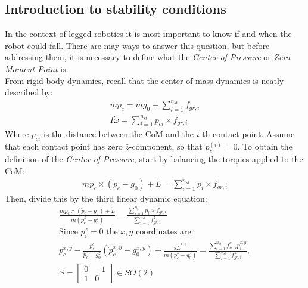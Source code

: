 \subsection{Introduction to stability conditions}
In the context of legged robotics it is most important to know if and when the robot could fall. There are may ways to answer this question, but before addressing them, it is necessary to define what the \textit{Center of Pressure} or \textit{Zero Moment Point} is.\\
From rigid-body dynamics, recall that the center of mass dynamics is neatly described by:
\begin{gather*}
    m\ddot{p}_c=mg_0+\sum_{i=1}^{n_{st}}f_{gr,i}\\
    I\dot{\omega}=\sum_{i=1}^{n_{st}}p_{ci}\times f_{gr,i}
\end{gather*}
Where $p_{ci}$ is the distance between the CoM and the $i$-th contact point. Assume that each contact point has zero $\hat{z}$-component, so that $p_z^{(i)}=0$. To obtain the definition of the \textit{Center of Pressure}, start by balancing the torques applied to the CoM:
\begin{gather*}
    mp_c\times(\ddot{p}_c-g_0)+\dot{L}=\sum_{i=1}^{n_{st}}p_i\times f_{gr,i}
\end{gather*}
Then, divide this by the third linear dynamic equation:
\begin{gather*}
    \frac{mp_c\times(\ddot{p}_c-g_0)+\dot{L}}{m(\ddot{p}_c^z-g_0^z)}=\frac{\sum_{i=1}^{n_{st}}p_i\times f_{gr,i}}{\sum_{i=1}^{n_{st}}f_{gr,i}^{z}}\\
    \text{Since $p_{i}^z=0$ the $x,y$ coordinates are:}\\
    p_c^{x,y}-\frac{p_z^c}{\ddot{p}_c^z-g_0^z}\left(\ddot{p}_c^{x,y}-g_0^{x,y}\right)+\frac{s\dot{L}^{x,y}}{m\left(\ddot{p}_c^z-g_0^z\right)}=\frac{\sum_{i=1}^{n_{st}}f_{gr,i}^{z}p_{i}^{x,y}}{\sum_{i=1}^{n_{st}}f_{gr,i}^{z}},\\
    S=\begin{bmatrix}
        0 & -1 \\ 1 & 0
    \end{bmatrix}\in SO(2)
\end{gather*}
